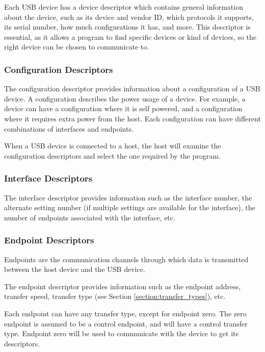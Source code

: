 Each USB device has a device descriptor which contains general information about the device, such as its device and vendor ID, which protocols it supports, its serial number, how much configurations it has, and more. This descriptor is essential, as it allows a program to find specific devices or kind of devices, so the right device can be chosen to communicate to.

\subsubsection{Configuration Descriptors}

The configuration descriptor provides information about a configuration of a USB device. A configuration describes the power usage of a device. For example, a device can have a configuration where it is self powered, and a configuration where it requires extra power from the host. Each configuration can have different combinations of interfaces and endpoints.

When a USB device is connected to a host, the host will examine the configuration descriptors and select the one required by the program.

\subsubsection{Interface Descriptors}

The interface descriptor provides information such as the interface number, the alternate setting number (if multiple settings are available for the interface), the number of endpoints associated with the interface, etc.

\subsubsection{Endpoint Descriptors}

Endpoints are the communication channels through which data is transmitted between the host device and the USB device.

The endpoint descriptor provides information such as the endpoint address, transfer speed, transfer type (see Section \ref{section:transfer_types}), etc.

Each endpoint can have any transfer type, except for endpoint zero. The zero endpoint is assumed to be a control endpoint, and will have a control transfer type. Endpoint zero will be used to communicate with the device to get its descriptors.

